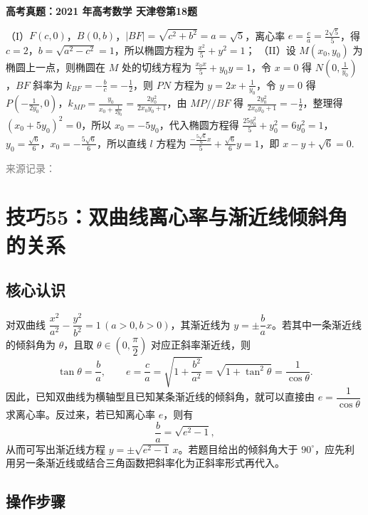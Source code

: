 \documentclass[UTF8,a4paper,11pt]{ctexart}
\newenvironment{gaokao}[1]{\par\medskip\noindent\textbf{高考真题：#1}\par\smallskip}{\par\medskip}
\begin{document}
\begin{gaokao}{2021 年高考数学 天津卷第18题}
（I）$F(c,0)$，$B(0,b)$，$|BF| = \sqrt{c^2+b^2} = a = \sqrt{5}$，离心率 $e = \frac{c}{a} = \frac{2\sqrt{5}}{5}$，得 $c=2$，$b = \sqrt{a^2-c^2} = 1$，所以椭圆方程为 $\frac{x^2}{5} + y^2 = 1$；
（II）设 $M(x_0,y_0)$ 为椭圆上一点，则椭圆在 $M$ 处的切线方程为 $\frac{x_0 x}{5} + y_0 y = 1$，令 $x=0$ 得 $N\left(0,\frac{1}{y_0}\right)$，$BF$ 斜率为 $k_{BF} = -\frac{b}{c} = -\frac{1}{2}$，则 $PN$ 方程为 $y = 2x + \frac{1}{y_0}$，令 $y=0$ 得 $P\left(-\frac{1}{2y_0},0\right)$，$k_{MP} = \frac{y_0}{x_0+\frac{1}{2y_0}} = \frac{2y_0^2}{2x_0 y_0+1}$，由 $MP // BF$ 得 $\frac{2y_0^2}{2x_0 y_0+1} = -\frac{1}{2}$，整理得 $(x_0+5y_0)^2=0$，所以 $x_0 = -5y_0$，代入椭圆方程得 $\frac{25y_0^2}{5}+y_0^2=6y_0^2=1$，$y_0 = \frac{\sqrt{6}}{6}$，$x_0 = -\frac{5\sqrt{6}}{6}$，所以直线 $l$ 方程为 $\frac{-\frac{5\sqrt{6}}{6}x}{5} + \frac{\sqrt{6}}{6}y = 1$，即 $x - y + \sqrt{6}=0$.

\par\smallskip\textcolor{gray}{\footnotesize 来源记录：\texttt{}}

\end{gaokao}

\clearpage

\section{技巧55：双曲线离心率与渐近线倾斜角的关系}

\subsection*{核心认识}

对双曲线 $\dfrac{x^2}{a^2}-\dfrac{y^2}{b^2}=1\,(a>0,b>0)$，其渐近线为 $y=\pm \dfrac{b}{a}x$。若其中一条渐近线的倾斜角为 $\theta$，且取 $\theta\in\left(0,\dfrac{\pi}{2}\right)$ 对应正斜率渐近线，则
\[
\tan\theta=\frac{b}{a},\qquad e=\frac{c}{a}=\sqrt{1+\frac{b^2}{a^2}}=\sqrt{1+\tan^2\theta}=\frac{1}{\cos\theta}.
\]
因此，已知双曲线为横轴型且已知某条渐近线的倾斜角，就可以直接由 $e=\dfrac{1}{\cos\theta}$ 求离心率。反过来，若已知离心率 $e$，则有
\[
\frac{b}{a}=\sqrt{e^2-1},
\]
从而可写出渐近线方程 $y=\pm \sqrt{e^2-1}\,x$。若题目给出的倾斜角大于 $90^\circ$，应先利用另一条渐近线或结合三角函数把斜率化为正斜率形式再代入。

\subsection*{操作步骤}
\end{document}

